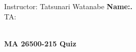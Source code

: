 \documentclass[11pt,letterpaper,addpoints]{exam}%
\begin{document}




\noindent Instructor: Tatsunari Watanabe
\hfill \textbf{Name:\underline{\phantom{My name way too long}}.}\\
\noindent TA: \href{mailto:\email}{\auth}
\\\\
\begin{center}
  {\Large \textbf{MA 26500-215 \quad Quiz \examnum}}

  \bigskip

  \examdate
\end{center}

\printanswers
\CorrectChoiceEmphasis{\color{Red!85!black}\bfseries}


\end{document}
